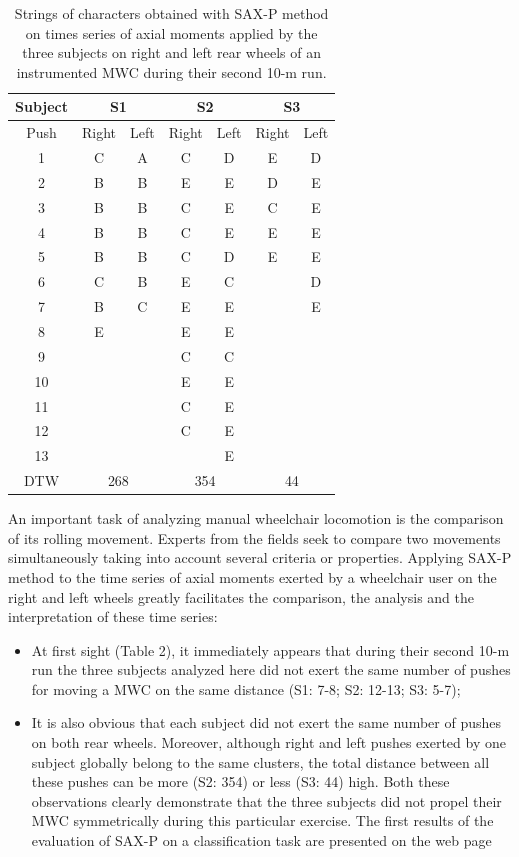 \begin{center}

\begin{table}
\center
\begin{tabular}{|c|c|c|c|c|c|c|}
\hline 
Subject & \multicolumn{2}{c|}{S1} & \multicolumn{2}{c|}{S2} & \multicolumn{2}{c|}{S3}\tabularnewline
\hline 
\hline 
Push & Right & Left & Right & Left & Right & Left\tabularnewline
\hline 
1 & C & A & C & D & E & D\tabularnewline
\hline 
2 & B & B & E & E & D & E\tabularnewline
\hline 
3 & B & B & C & E & C & E\tabularnewline
\hline 
4 & B & B & C & E & E & E\tabularnewline
\hline 
5 & B & B & C & D & E & E\tabularnewline
\hline 
6 & C & B & E & C &  & D\tabularnewline
\hline 
7 & B & C & E & E &  & E\tabularnewline
\hline 
8 & E &  & E & E &  & \tabularnewline
\hline 
9 &  &  & C & C &  & \tabularnewline
\hline 
10 &  &  & E & E &  & \tabularnewline
\hline 
11 &  &  & C & E &  & \tabularnewline
\hline 
12 &  &  & C & E &  & \tabularnewline
\hline 
13 &  &  &  & E &  & \tabularnewline
\hline 
DTW & \multicolumn{2}{c|}{268} & \multicolumn{2}{c|}{354} & \multicolumn{2}{c|}{44}\tabularnewline
\hline 
\end{tabular}

\protect\caption{Strings of characters obtained with SAX-P method on times series of
axial moments applied by the three subjects on right and left rear
wheels of an instrumented MWC during their second 10-m run.}
\label{tab:symbole}

\end{table}

\end{center}





An important task of analyzing manual wheelchair locomotion 
 is the comparison of its rolling movement. Experts from the fields seek to 
 compare two movements simultaneously taking into account 
 several criteria or properties. Applying SAX-P method to the time series 
 of axial moments exerted
by a wheelchair user on the right and left wheels greatly
facilitates the comparison, the analysis and the interpretation of these time series: 
\begin{itemize}
\item At first sight (Table 2), it immediately appears that during their
second 10-m run the three subjects analyzed here did not exert the
same number of pushes for moving a MWC on the same distance (S1:
7-8; S2: 12-13; S3: 5-7); 
\item It is also obvious that each subject did not exert the same number
of pushes on both rear wheels. Moreover, although right and left pushes
exerted by one subject globally belong to the same clusters, the total
distance between all these pushes can be more (S2: 354) or less (S3:
44) high. Both these observations clearly demonstrate that the three
subjects did not propel their MWC symmetrically during this particular
exercise. The first results of the evaluation of SAX-P on a classification task are presented on
the web page \cite{Validation}
\end{itemize}


